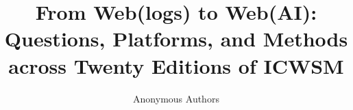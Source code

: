 \documentclass[letterpaper]{article} %
\title{From Web(logs) to Web(AI): Questions, Platforms, and Methods\\ across Twenty Editions of ICWSM}
\author{Anonymous Authors}
\begin{document}
\maketitle

\begin{abstract}

\end{abstract}
















\appendix

\end{document}
